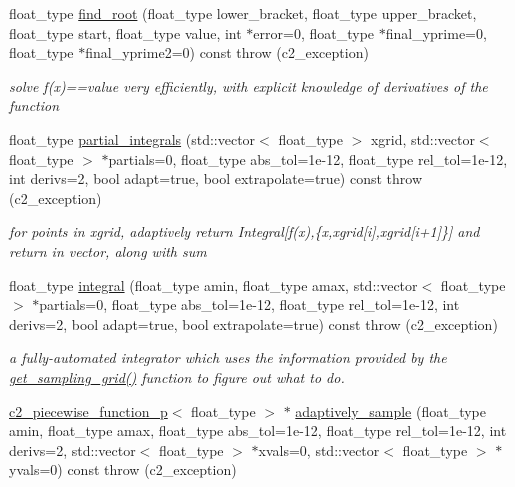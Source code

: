 \begin{DoxyCompactItemize}
float\+\_\+type \hyperlink{classc2__function_acd17a7191226578c866d82cb2e9ff89f}{find\+\_\+root} (float\+\_\+type lower\+\_\+bracket, float\+\_\+type upper\+\_\+bracket, float\+\_\+type start, float\+\_\+type value, int $\ast$error=0, float\+\_\+type $\ast$final\+\_\+yprime=0, float\+\_\+type $\ast$final\+\_\+yprime2=0) const   throw (c2\+\_\+exception)
\begin{DoxyCompactList}\small\item\em solve f(x)==value very efficiently, with explicit knowledge of derivatives of the function \end{DoxyCompactList}\item 
float\+\_\+type \hyperlink{classc2__function_a89ce5e2f44ebfaf9eb4d66605cde4fde}{partial\+\_\+integrals} (std\+::vector$<$ float\+\_\+type $>$ xgrid, std\+::vector$<$ float\+\_\+type $>$ $\ast$partials=0, float\+\_\+type abs\+\_\+tol=1e-\/12, float\+\_\+type rel\+\_\+tol=1e-\/12, int derivs=2, bool adapt=true, bool extrapolate=true) const   throw (c2\+\_\+exception)
\begin{DoxyCompactList}\small\item\em for points in xgrid, adaptively return Integral\mbox{[}f(x),\{x,xgrid\mbox{[}i\mbox{]},xgrid\mbox{[}i+1\mbox{]}\}\mbox{]} and return in vector, along with sum \end{DoxyCompactList}\item 
float\+\_\+type \hyperlink{classc2__function_a675c5056562332be2e49b38485d322b7}{integral} (float\+\_\+type amin, float\+\_\+type amax, std\+::vector$<$ float\+\_\+type $>$ $\ast$partials=0, float\+\_\+type abs\+\_\+tol=1e-\/12, float\+\_\+type rel\+\_\+tol=1e-\/12, int derivs=2, bool adapt=true, bool extrapolate=true) const   throw (c2\+\_\+exception)
\begin{DoxyCompactList}\small\item\em a fully-\/automated integrator which uses the information provided by the \hyperlink{classc2__function_ad03264dcc015e5d0b1b6eb30df3f32be}{get\+\_\+sampling\+\_\+grid()} function to figure out what to do. \end{DoxyCompactList}\item 
\hyperlink{classc2__piecewise__function__p}{c2\+\_\+piecewise\+\_\+function\+\_\+p}$<$ float\+\_\+type $>$ $\ast$ \hyperlink{classc2__function_aea75f73d6a97087571c163ae4e514652}{adaptively\+\_\+sample} (float\+\_\+type amin, float\+\_\+type amax, float\+\_\+type abs\+\_\+tol=1e-\/12, float\+\_\+type rel\+\_\+tol=1e-\/12, int derivs=2, std\+::vector$<$ float\+\_\+type $>$ $\ast$xvals=0, std\+::vector$<$ float\+\_\+type $>$ $\ast$yvals=0) const   throw (c2\+\_\+exception)

\end{DoxyCompactItemize}
